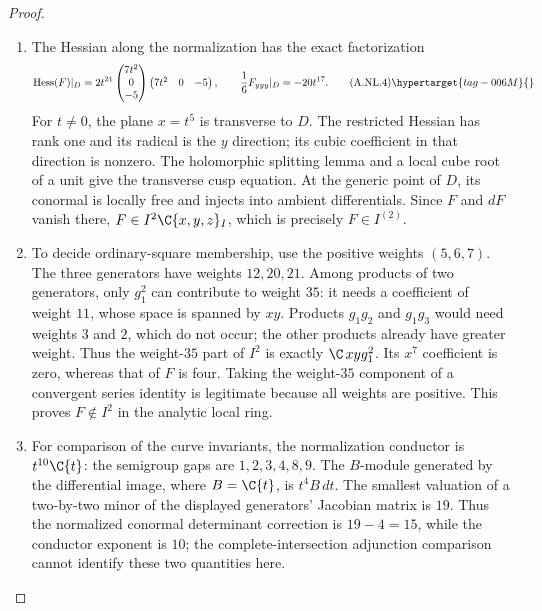 \begin{proof}
\begin{enumerate}[label={$\langle1\rangle$\arabic*.},leftmargin=*]
\item The Hessian along the normalization has the exact factorization
\[
 \operatorname{Hess}(F)|_D
 =2t^{21}
 \begin{pmatrix}7t^2\\0\\-5\end{pmatrix}
 \begin{pmatrix}7t^2&0&-5\end{pmatrix},
 \qquad \frac{1}{6}F_{yyy}|_D=-20t^{17}.                       \tag{A.NL.4}\hypertarget{tag-006M}{}\label{cdp:eq:A.NL.4}
\]
For $t\ne0$, the plane $x=t^5$ is transverse to $D$.
The restricted Hessian has rank one and its radical is the
$y$ direction; its cubic coefficient in that direction is nonzero.
The holomorphic splitting lemma and a local cube root of a unit
give the transverse cusp equation. At the generic point of $D$,
its conormal is locally free and injects into ambient differentials.
Since $F$ and $dF$ vanish there, $F\in I^2\C\{x,y,z\}_I$,
which is precisely $F\in I^{(2)}$.

\item To decide ordinary-square membership, use the positive weights
$(5,6,7)$. The three generators have weights $12,20,21$.
Among products of two generators, only $g_1^2$ can contribute
to weight $35$: it needs a coefficient of weight $11$, whose
space is spanned by $xy$. Products $g_1g_2$ and $g_1g_3$ would
need weights $3$ and $2$, which do not occur; the other products
already have greater weight. Thus the weight-$35$ part of $I^2$
is exactly $\C\,xyg_1^2$. Its $x^7$ coefficient is zero, whereas
that of $F$ is four. Taking the weight-$35$ component of a
convergent series identity is legitimate because all weights are
positive. This proves $F\notin I^2$ in the analytic local ring.

\item For comparison of the curve invariants, the normalization conductor
is $t^{10}\C\{t\}$: the semigroup gaps are $1,2,3,4,8,9$.
The $B$-module generated by the differential image, where $B=\C\{t\}$, is $t^4B\,dt$.
The smallest valuation of a two-by-two minor of the displayed
generators' Jacobian matrix is $19$. Thus the normalized conormal
determinant correction is $19-4=15$, while the conductor exponent
is $10$; the complete-intersection adjunction comparison cannot
identify these two quantities here.


\end{enumerate}
\end{proof}
